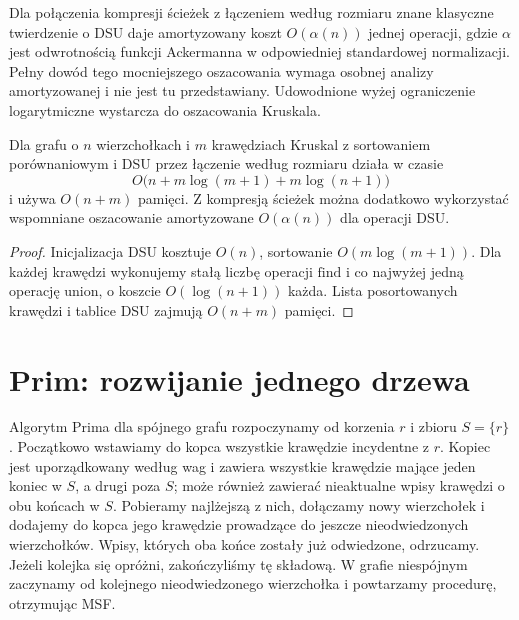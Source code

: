 \begin{uwaga}
Dla połączenia kompresji ścieżek
z łączeniem według rozmiaru
znane klasyczne twierdzenie
o DSU daje amortyzowany koszt
$O(\alpha(n))$ jednej operacji,
gdzie $\alpha$ jest odwrotnością
funkcji Ackermanna w odpowiedniej
standardowej normalizacji.
Pełny dowód tego mocniejszego
oszacowania wymaga osobnej
analizy amortyzowanej i nie
jest tu przedstawiany.
Udowodnione wyżej ograniczenie
logarytmiczne wystarcza
do oszacowania Kruskala.
\end{uwaga}

\begin{stwierdzenie}
\label{prop:tg-mst-kruskal-cost}
Dla grafu o $n$ wierzchołkach
i $m$ krawędziach Kruskal
z sortowaniem porównaniowym
i DSU przez łączenie według
rozmiaru działa w czasie
\[
O\bigl(n+m\log(m+1)+
      m\log(n+1)\bigr)
\]
i używa $O(n+m)$ pamięci.
Z kompresją ścieżek można
dodatkowo wykorzystać
wspomniane oszacowanie
amortyzowane $O(\alpha(n))$
dla operacji DSU.
\end{stwierdzenie}
\begin{proof}
Inicjalizacja DSU kosztuje $O(n)$,
sortowanie $O(m\log(m+1))$.
Dla każdej krawędzi wykonujemy
stałą liczbę operacji
$\mathrm{find}$ i co najwyżej
jedną operację $\mathrm{union}$,
o koszcie $O(\log(n+1))$ każda.
Lista posortowanych krawędzi
i tablice DSU zajmują $O(n+m)$
pamięci.
\end{proof}

\section{Prim: rozwijanie jednego drzewa}
\label{sec:tg-mst-prim}

Algorytm Prima dla spójnego
grafu rozpoczynamy od korzenia
$r$ i zbioru $S=\{r\}$.
Początkowo wstawiamy do kopca wszystkie krawędzie
incydentne z $r$. Kopiec jest uporządkowany według wag
i zawiera wszystkie krawędzie mające jeden koniec
w $S$, a drugi poza $S$; może również zawierać
nieaktualne wpisy krawędzi o obu końcach w $S$.
Pobieramy najlżejszą z nich,
dołączamy nowy wierzchołek
i dodajemy do kopca jego
krawędzie prowadzące
do jeszcze nieodwiedzonych
wierzchołków. Wpisy,
których oba końce zostały
już odwiedzone, odrzucamy.
Jeżeli kolejka się opróżni,
zakończyliśmy tę składową.
W grafie niespójnym zaczynamy
od kolejnego nieodwiedzonego
wierzchołka i powtarzamy
procedurę, otrzymując MSF.

